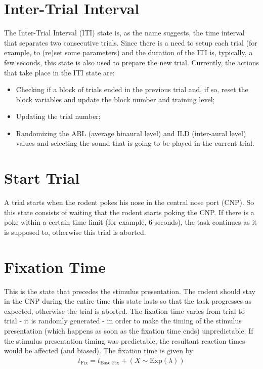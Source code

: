 \section{Inter-Trial Interval}
\label{sec:iti}
The Inter-Trial Interval (ITI) state is, as the name suggests, the time interval that separates two consecutive trials. Since there is a need to setup each trial (for example, to (re)set some parameters) and the duration of the ITI is, typically, a few seconds, this state is also used to prepare the new trial. Currently, the actions that take place in the ITI state are:
\begin{itemize}
    \item Checking if a block of trials ended in the previous trial and, if so, reset the block variables and update the block number and training level;
    \item Updating the trial number;
    \item Randomizing the ABL (average binaural level) and ILD (inter-aural level) values and selecting the sound that is going to be played in the current trial.
\end{itemize}

\section{Start Trial}
\label{sec:start_trial}
A trial starts when the rodent pokes his nose in the central nose port (CNP). So this state consists of waiting that the rodent starts poking the CNP. If there is a poke within a certain time limit (for example, 6 seconds), the task continues as it is supposed to, otherwise this trial is aborted.

\section{Fixation Time}
\label{sec:fixation_time}
This is the state that precedes the stimulus presentation. The rodent should stay in the CNP during the entire time this state lasts so that the task progresses as expected, otherwise the trial is aborted. The fixation time varies from trial to trial - it is randomly generated - in order to make the timing of the stimulus presentation (which happens as soon as the fixation time ends) unpredictable. If the stimulus presentation timing was predictable, the resultant reaction times would be affected (and biased). The fixation time is given by:
\begin{gather}
    t_{\text{Fix}} = t_{\text{Base Fix}} + (X \sim \text{Exp}(\lambda))
\end{gather}

